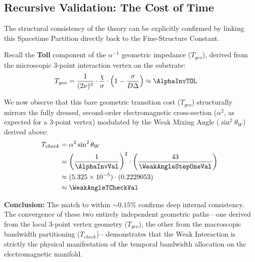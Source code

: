 \subsection{Recursive Validation: The Cost of Time}

The structural consistency of the theory can be explicitly confirmed by linking this Spacetime Partition directly back to the Fine-Structure Constant. 

Recall the \textbf{Toll} component of the $\alpha^{-1}$ geometric impedance ($T_{geo}$), derived from the microscopic 3-point interaction vertex on the substrate:
\begin{equation}
\begin{split}
    T_{geo} &= \frac{1}{(2\nu)^3} \cdot \frac{\chi}{\sigma} \cdot \left(1 - \frac{\sigma}{D\Delta} \right) \approx \AlphaInvTOL
\end{split}
\end{equation}

We now observe that this bare geometric transition cost ($T_{geo}$) structurally mirrors the fully dressed, second-order electromagnetic cross-section ($\alpha^2$, as expected for a 3-point vertex) modulated by the Weak Mixing Angle ($\sin^2 \theta_W$) derived above:
\begin{equation}
\begin{split}
T_{check} &= \alpha^2 \sin^2 \theta_W \\
&= \left(\frac{1}{\AlphaInvVal}\right)^2 \cdot \left(\frac{43}{\WeakAngleStepOneVal}\right) \\
&\approx (5.325 \times 10^{-5}) \cdot (0.2229053) \\
&\approx \WeakAngleTCheckVal
\end{split}
\end{equation}

\textbf{Conclusion:} The match to within $\sim 0.15\%$ confirms deep internal consistency. The convergence of these two entirely independent geometric paths---one derived from the local 3-point vertex geometry ($T_{geo}$), the other from the macroscopic bandwidth partitioning ($T_{check}$)---demonstrates that the Weak Interaction is strictly the physical manifestation of the temporal bandwidth allocation on the electromagnetic manifold.